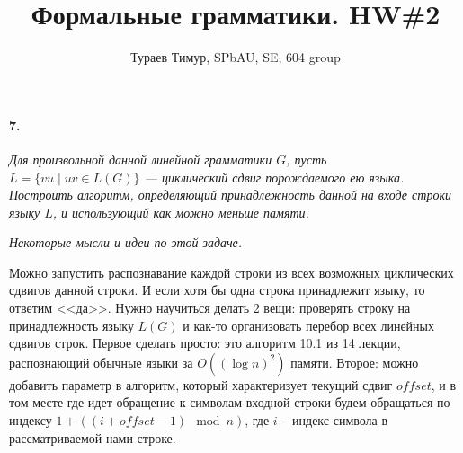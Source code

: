 \documentclass[russian,table]{article}
\begin{document}
\title{Формальные грамматики. HW\#2}
\author{Тураев Тимур, SPbAU, SE, 604 group}
\maketitle

\paragraph*{7.}

\textit{Для произвольной данной линейной грамматики $G$, пусть $L=\{vu \mid uv \in L(G)\}$ — циклический сдвиг порождаемого ею языка. Построить алгоритм, определяющий принадлежность данной на входе строки языку $L$, и использующий как можно меньше памяти. \\}

\textit{Некоторые мысли и идеи по этой задаче.}

Можно запустить распознавание каждой строки из всех возможных циклических сдвигов данной строки. И если хотя бы одна строка принадлежит языку, то ответим <<да>>. Нужно научиться делать 2 вещи: проверять строку на принадлежность языку $L(G)$ и как-то организовать перебор всех линейных сдвигов строк.
Первое сделать просто: это алгоритм 10.1 из 14 лекции, распознающий обычные языки за $O((\log n)^2)$ памяти.
Второе: можно добавить параметр в алгоритм, который характеризует текущий сдвиг $\mathit{offset}$, и в том месте где идет обращение к символам входной строки будем обращаться по индексу $1 + ((i + \mathit{offset}-1) \mod n)$, где $i$ -- индекс символа в рассматриваемой нами строке.
\end{document}
